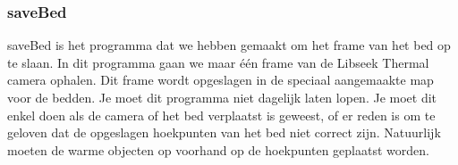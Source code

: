 \subsubsection{saveBed}
saveBed is het programma dat we hebben gemaakt om het frame van het bed op te slaan. In dit programma gaan we maar \'e\'en frame van de Libseek Thermal camera ophalen. Dit frame wordt opgeslagen in de speciaal aangemaakte map voor de bedden. Je moet dit programma niet dagelijk laten lopen. Je moet dit enkel doen als de camera of het bed verplaatst is geweest, of er reden is om te geloven dat de opgeslagen hoekpunten van het bed niet correct zijn. Natuurlijk moeten de warme objecten op voorhand op de hoekpunten geplaatst worden. 
